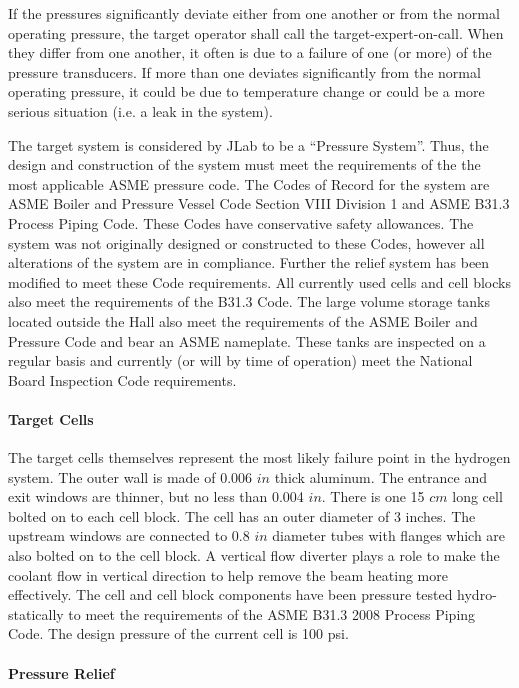 \begin{safetyen}{0}{0}
If the pressures significantly deviate either from one another or
from the normal operating pressure, the target operator shall call
the target-expert-on-call. When they differ from one another, it often
is due to a failure of one (or more) of the pressure transducers.
If more than one deviates significantly from the normal operating pressure,
it could be due to temperature change or could be a more serious situation
(i.e. a leak in the system).

The target system is considered by JLab to be a ``Pressure System''.
Thus, the design and construction of the system must meet the requirements
of the the most applicable ASME pressure code. The Codes of Record
for the system are ASME Boiler and Pressure Vessel Code Section VIII
Division 1 and ASME B31.3 Process Piping Code. These Codes have conservative
safety allowances. The system was not originally designed or constructed
to these Codes, however all alterations of the system are in compliance.
Further the relief system has been modified to meet these Code requirements.
All currently used cells and cell blocks also meet the requirements
of the B31.3 Code. The large volume storage tanks located outside
the Hall also meet the requirements of the ASME Boiler and Pressure
Code and bear an ASME nameplate. These tanks are inspected on a regular
basis and currently (or will by time of operation) meet the National
Board Inspection Code requirements.

\paragraph{Target Cells}

The target cells themselves represent the most likely failure point
in the hydrogen system. The outer wall is made of 0.006 $in$ thick
aluminum. The entrance and exit windows are thinner, but no less than
0.004 $in$. There is one 15 $cm$ long cell bolted on to each cell
block. The cell has an outer diameter of 3 inches. The upstream windows
are connected to 0.8 $in$ diameter tubes with flanges which are also
bolted on to the cell block. A vertical flow diverter plays a role
to make the coolant flow in vertical direction to help remove the
beam heating more effectively. The cell and cell block components
have been pressure tested hydro-statically to meet the requirements
of the ASME B31.3 2008 Process Piping Code. The design pressure of
the current cell is 100 psi.


\paragraph{Pressure Relief}


\end{safetyen}
